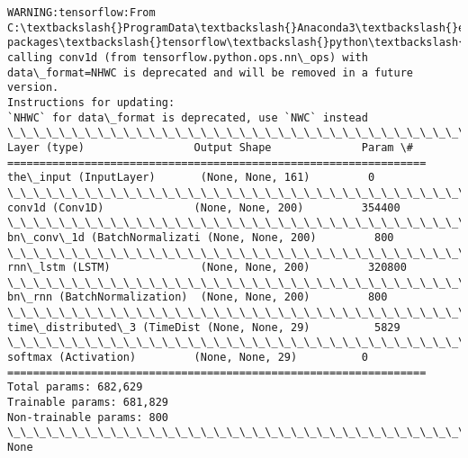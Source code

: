 \documentclass[11pt]{article}
\begin{document}
    \begin{Verbatim}[commandchars=\\\{\}]
WARNING:tensorflow:From C:\textbackslash{}ProgramData\textbackslash{}Anaconda3\textbackslash{}envs\textbackslash{}nbkeras\textbackslash{}lib\textbackslash{}site-packages\textbackslash{}tensorflow\textbackslash{}python\textbackslash{}util\textbackslash{}deprecation.py:497: calling conv1d (from tensorflow.python.ops.nn\_ops) with data\_format=NHWC is deprecated and will be removed in a future version.
Instructions for updating:
`NHWC` for data\_format is deprecated, use `NWC` instead
\_\_\_\_\_\_\_\_\_\_\_\_\_\_\_\_\_\_\_\_\_\_\_\_\_\_\_\_\_\_\_\_\_\_\_\_\_\_\_\_\_\_\_\_\_\_\_\_\_\_\_\_\_\_\_\_\_\_\_\_\_\_\_\_\_
Layer (type)                 Output Shape              Param \#   
=================================================================
the\_input (InputLayer)       (None, None, 161)         0         
\_\_\_\_\_\_\_\_\_\_\_\_\_\_\_\_\_\_\_\_\_\_\_\_\_\_\_\_\_\_\_\_\_\_\_\_\_\_\_\_\_\_\_\_\_\_\_\_\_\_\_\_\_\_\_\_\_\_\_\_\_\_\_\_\_
conv1d (Conv1D)              (None, None, 200)         354400    
\_\_\_\_\_\_\_\_\_\_\_\_\_\_\_\_\_\_\_\_\_\_\_\_\_\_\_\_\_\_\_\_\_\_\_\_\_\_\_\_\_\_\_\_\_\_\_\_\_\_\_\_\_\_\_\_\_\_\_\_\_\_\_\_\_
bn\_conv\_1d (BatchNormalizati (None, None, 200)         800       
\_\_\_\_\_\_\_\_\_\_\_\_\_\_\_\_\_\_\_\_\_\_\_\_\_\_\_\_\_\_\_\_\_\_\_\_\_\_\_\_\_\_\_\_\_\_\_\_\_\_\_\_\_\_\_\_\_\_\_\_\_\_\_\_\_
rnn\_lstm (LSTM)              (None, None, 200)         320800    
\_\_\_\_\_\_\_\_\_\_\_\_\_\_\_\_\_\_\_\_\_\_\_\_\_\_\_\_\_\_\_\_\_\_\_\_\_\_\_\_\_\_\_\_\_\_\_\_\_\_\_\_\_\_\_\_\_\_\_\_\_\_\_\_\_
bn\_rnn (BatchNormalization)  (None, None, 200)         800       
\_\_\_\_\_\_\_\_\_\_\_\_\_\_\_\_\_\_\_\_\_\_\_\_\_\_\_\_\_\_\_\_\_\_\_\_\_\_\_\_\_\_\_\_\_\_\_\_\_\_\_\_\_\_\_\_\_\_\_\_\_\_\_\_\_
time\_distributed\_3 (TimeDist (None, None, 29)          5829      
\_\_\_\_\_\_\_\_\_\_\_\_\_\_\_\_\_\_\_\_\_\_\_\_\_\_\_\_\_\_\_\_\_\_\_\_\_\_\_\_\_\_\_\_\_\_\_\_\_\_\_\_\_\_\_\_\_\_\_\_\_\_\_\_\_
softmax (Activation)         (None, None, 29)          0         
=================================================================
Total params: 682,629
Trainable params: 681,829
Non-trainable params: 800
\_\_\_\_\_\_\_\_\_\_\_\_\_\_\_\_\_\_\_\_\_\_\_\_\_\_\_\_\_\_\_\_\_\_\_\_\_\_\_\_\_\_\_\_\_\_\_\_\_\_\_\_\_\_\_\_\_\_\_\_\_\_\_\_\_
None

    \end{Verbatim}
\end{document}
